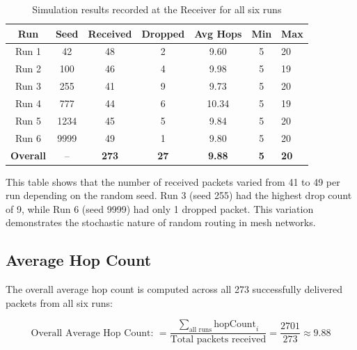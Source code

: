 \documentclass[12pt,a4paper]{article}
\begin{document}
\begin{table}[H]
\centering
\renewcommand{\arraystretch}{1.5}
\begin{tabular}{@{}ccccccl@{}}
\toprule
\textbf{Run} & \textbf{Seed} & \textbf{Received} & \textbf{Dropped} & \textbf{Avg Hops} & \textbf{Min} & \textbf{Max} \\
\midrule
Run 1 & 42   & 48 & 2 & 9.60  & 5 & 20 \\
Run 2 & 100  & 46 & 4 & 9.98  & 5 & 19 \\
Run 3 & 255  & 41 & 9 & 9.73  & 5 & 20 \\
Run 4 & 777  & 44 & 6 & 10.34 & 5 & 19 \\
Run 5 & 1234 & 45 & 5 & 9.84  & 5 & 20 \\
Run 6 & 9999 & 49 & 1 & 9.80  & 5 & 20 \\
\midrule
\textbf{Overall} & -- & \textbf{273} & \textbf{27} & \textbf{9.88} & \textbf{5} & \textbf{20} \\
\bottomrule
\end{tabular}
\caption{Simulation results recorded at the Receiver for all six runs}
\end{table}

\justifying
This table shows that the number of received packets varied from 41 to 49 per run depending on the random seed. Run 3 (seed 255) had the highest drop count of 9, while Run 6 (seed 9999) had only 1 dropped packet. This variation demonstrates the stochastic nature of random routing in mesh networks.

\subsection{Average Hop Count}
\label{sec:avg}

\justifying
The overall average hop count is computed across all 273 successfully delivered packets from all six runs:

\[
\text{Overall Average Hop Count: }
= \frac{\sum_{\text{all runs}} \text{hopCount}_i}{\text{Total packets received}}
= \frac{2701}{273} \approx \mathbf{9.88}
\]
\end{document}
